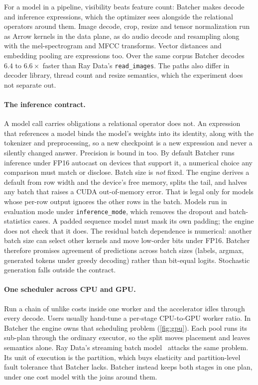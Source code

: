 \documentclass[10pt,twocolumn,letterpaper]{article}   %
\newcommand{\sys}{Batcher}
\begin{document}
For a model in a pipeline, visibility beats feature count: \sys{} makes decode and inference
expressions, which the optimizer sees alongside the relational operators around them. Image decode, crop, resize and tensor normalization run as Arrow kernels
in the data plane, as do audio decode and resampling along with the mel-spectrogram and MFCC
transforms. Vector distances and embedding pooling are expressions too. Over the same corpus
\sys{} decodes $6.4$ to $6.6\times$ faster than Ray Data's \texttt{read\_images}. The paths also
differ in decoder library, thread count and resize semantics, which the experiment does not
separate out.

\paragraph{The inference contract.} A model call carries obligations a relational operator
does not. An expression that references a model binds the model's weights into its identity,
along with the tokenizer and preprocessing, so a new checkpoint is a new expression and never a
silently changed answer. Precision is bound in too. By default \sys{} runs inference under FP16
autocast on devices that support it, a numerical choice any comparison must match or disclose.
Batch size is \emph{not} fixed. The engine derives a default
from row width and the device's free memory, splits the tail, and halves any batch that raises
a CUDA out-of-memory error. That is legal only for models whose per-row output ignores the
other rows in the batch. Models run in evaluation mode under \texttt{inference\_mode}, which
removes the dropout and batch-statistics cases. A padded sequence model must mask its own
padding; the engine does not check that it does. The residual batch dependence is numerical: another batch size can select
other kernels and move low-order bits under FP16. \sys{} therefore promises agreement of
predictions across batch sizes (labels, argmax, generated tokens under greedy decoding) rather
than bit-equal logits. Stochastic generation falls outside the contract.

\paragraph{One scheduler across CPU and GPU.}
\label{sec:gpu}
Run a chain of unlike costs inside one worker and the accelerator idles through every decode.
Users usually hand-tune a per-stage CPU-to-GPU worker ratio. In \sys{} the engine owns that
scheduling problem (\cref{fig:gpu}). Each pool runs its sub-plan through the ordinary
executor, so the split moves placement and leaves semantics alone. Ray Data's streaming batch
model~\cite{luan2025streamingbatch} attacks the same problem. Its unit of execution is the
partition, which buys elasticity and partition-level fault tolerance that \sys{} lacks. \sys{}
instead keeps both stages in one plan, under one cost model with the joins around them.
\end{document}
